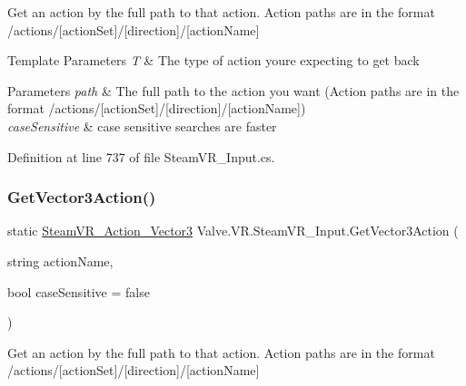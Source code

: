 Get an action by the full path to that action. Action paths are in the format /actions/\mbox{[}action\+Set\mbox{]}/\mbox{[}direction\mbox{]}/\mbox{[}action\+Name\mbox{]} 


\begin{DoxyTemplParams}{Template Parameters}
{\em T} & The type of action you\textquotesingle{}re expecting to get back\\
\hline
\end{DoxyTemplParams}

\begin{DoxyParams}{Parameters}
{\em path} & The full path to the action you want (Action paths are in the format /actions/\mbox{[}action\+Set\mbox{]}/\mbox{[}direction\mbox{]}/\mbox{[}action\+Name\mbox{]})\\
\hline
{\em case\+Sensitive} & case sensitive searches are faster\\
\hline
\end{DoxyParams}


Definition at line 737 of file Steam\+V\+R\+\_\+\+Input.\+cs.

\mbox{\label{class_valve_1_1_v_r_1_1_steam_v_r___input_add35bdec1632c00a3b3110f049e93129}} 
\subsubsection{\texorpdfstring{GetVector3Action()}{GetVector3Action()}\hspace{0.1cm}{\footnotesize\ttfamily [2/2]}}
{\footnotesize\ttfamily static \mbox{\hyperlink{class_valve_1_1_v_r_1_1_steam_v_r___action___vector3}{Steam\+V\+R\+\_\+\+Action\+\_\+\+Vector3}} Valve.\+V\+R.\+Steam\+V\+R\+\_\+\+Input.\+Get\+Vector3\+Action (\begin{DoxyParamCaption}\item[{string}]{action\+Name,  }\item[{bool}]{case\+Sensitive = {\ttfamily false} }\end{DoxyParamCaption})\hspace{0.3cm}{\ttfamily [static]}}



Get an action by the full path to that action. Action paths are in the format /actions/\mbox{[}action\+Set\mbox{]}/\mbox{[}direction\mbox{]}/\mbox{[}action\+Name\mbox{]} 


